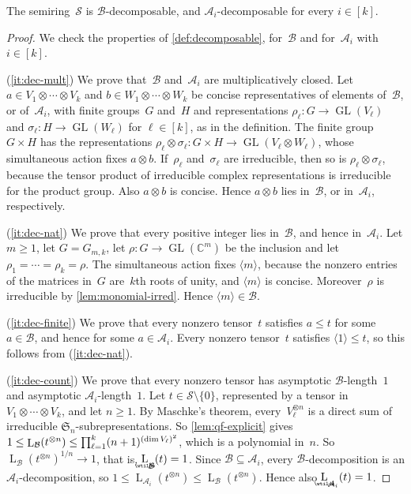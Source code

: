 \documentclass[11pt,letterpaper]{article}
\DeclareMathOperator{\declength}{L}
\DeclareMathOperator{\asympdeclength}{\underaccent{\wtilde}{L}}
\newcommand{\CC}{\mathbb{C}}
\DeclareMathOperator{\GL}{GL}
\begin{document}
\begin{lemma}\label{lem:tensor-decomp}
The semiring~$\mathcal{S}$ is $\mathcal{B}$-decomposable, and $\mathcal{A}_i$-decomposable for every $i \in [k]$.
\end{lemma}
\begin{proof}
We check the properties of \cref{def:decomposable}, for~$\mathcal{B}$ and for~$\mathcal{A}_i$ with $i \in [k]$.

(\ref{it:dec-mult}) We prove that~$\mathcal{B}$ and~$\mathcal{A}_i$ are multiplicatively closed. Let $a \in V_1 \otimes \cdots \otimes V_k$ and $b \in W_1 \otimes \cdots \otimes W_k$ be concise representatives of elements of~$\mathcal{B}$, or of~$\mathcal{A}_i$, with finite groups~$G$ and~$H$ and representations $\rho_\ell : G \to \GL(V_\ell)$ and $\sigma_\ell : H \to \GL(W_\ell)$ for $\ell \in [k]$, as in the definition. The finite group $G \times H$ has the representations $\rho_\ell \otimes \sigma_\ell : G \times H \to \GL(V_\ell \otimes W_\ell)$, whose simultaneous action fixes $a \otimes b$. If~$\rho_\ell$ and~$\sigma_\ell$ are irreducible, then so is $\rho_\ell \otimes \sigma_\ell$, because the tensor product of irreducible complex representations is irreducible for the product group. Also $a \otimes b$ is concise. Hence $a \otimes b$ lies in~$\mathcal{B}$, or in~$\mathcal{A}_i$, respectively.

(\ref{it:dec-nat}) We prove that every positive integer lies in~$\mathcal{B}$, and hence in~$\mathcal{A}_i$. Let $m \geq 1$, let $G = G_{m,k}$, let $\rho : G \to \GL(\CC^m)$ be the inclusion and let $\rho_1 = \cdots = \rho_k = \rho$. The simultaneous action fixes $\langle m \rangle$, because the nonzero entries of the matrices in~$G$ are~$k$th roots of unity, and $\langle m \rangle$ is concise. Moreover~$\rho$ is irreducible by \cref{lem:monomial-irred}. Hence $\langle m \rangle \in \mathcal{B}$.

(\ref{it:dec-finite}) We prove that every nonzero tensor~$t$ satisfies $a \leq t$ for some $a \in \mathcal{B}$, and hence for some $a \in \mathcal{A}_i$. Every nonzero tensor~$t$ satisfies $\langle 1 \rangle \leq t$, so this follows from (\ref{it:dec-nat}).

(\ref{it:dec-count}) We prove that every nonzero tensor has asymptotic $\mathcal{B}$-length~$1$ and asymptotic $\mathcal{A}_i$-length~$1$. Let $t \in \mathcal{S} \setminus \{0\}$, represented by a tensor in $V_1 \otimes \cdots \otimes V_k$, and let $n \geq 1$. By Maschke's theorem, every~$V_\ell^{\otimes n}$ is a direct sum of irreducible $\mathfrak{S}_n$-subrepresentations. So \cref{lem:qf-explicit} gives $1 \leq \declength_{\mathcal{B}}(t^{\otimes n}) \leq \prod_{\ell=1}^{\smash[t]{k}} (n+1)^{\smash{(\dim V_\ell)^2}}$, which is a polynomial in~$n$. So $\declength_{\mathcal{B}}(t^{\otimes n})^{1/n} \to 1$, that is, $\asympdeclength_{\mathcal{B}}(t) = 1$. Since $\mathcal{B} \subseteq \mathcal{A}_i$, every $\mathcal{B}$-decomposition is an $\mathcal{A}_i$-decomposition, so $1 \leq \declength_{\mathcal{A}_i}(t^{\otimes n}) \leq \declength_{\mathcal{B}}(t^{\otimes n})$. Hence also $\asympdeclength_{\mathcal{A}_i}(t) = 1$.
\end{proof}
\end{document}
